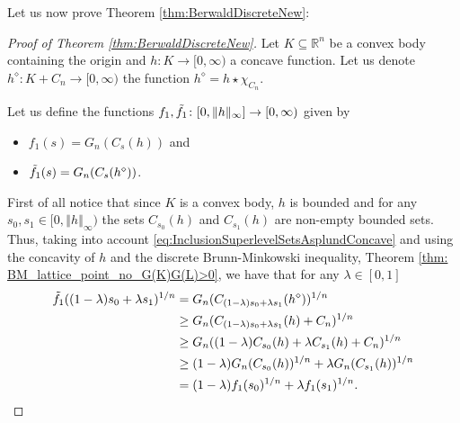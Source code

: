 \documentclass{amsart}
\newcommand{\R}{\mathbb R}
\newcommand{\norma}[1]{\left\Vert#1\right\Vert}
\theoremstyle{remark}
\theoremstyle{definition}
\numberwithin{equation}{section}
\begin{document}
Let us now prove Theorem \ref{thm:BerwaldDiscreteNew}:

\begin{proof}[Proof of Theorem \ref{thm:BerwaldDiscreteNew}]

Let $K\subseteq\R^n$ be a convex body containing the origin and $h:K\to[0,\infty)$ a concave function. Let us denote $h^\diamond: K+C_n\to[0,\infty)$ the function $h^\diamond=h\star\chi_{C_n}$.

Let us define the functions $f_1, \Tilde{f_1} \colon [0, \Vert h\Vert_\infty] \to [0, \infty)$ given by
\begin{itemize}
\item$f_1(s)=G_n(C_s(h))$ and
\item $\Tilde{f_1}(s)=G_n(C_s(h^\diamond))$.
\end{itemize}

First of all notice that since $K$ is a convex body, $h$ is bounded and for any $s_0, s_1 \in [0, \norma{h}_{\infty})$ the sets $C_{s_0}(h)$ and $C_{s_1}(h)$ are non-empty bounded sets. Thus, taking into account \eqref{eq:InclusionSuperlevelSetsAsplundConcave} and using the  concavity of $h$ and the discrete Brunn-Minkowski inequality, Theorem \ref{thm: BM_lattice_point_no_G(K)G(L)>0}, we have that for any $\lambda \in [0,1]$
\begin{align*}
\Tilde{f_1}((1-\lambda)s_0 + \lambda s_1)^{1/n} &= G_n(C_{(1-\lambda)s_0 + \lambda s_1}(h^\diamond))^{1/n} \\
&\geq G_n(C_{(1-\lambda)s_0 + \lambda s_1}(h) + C_n)^{1/n} \\
& \geq G_n((1-\lambda) C_{s_0}(h) + \lambda C_{s_1}(h) + C_n )^{1/n} \\
& \geq (1-\lambda) G_n(C_{s_0}(h))^{1/n} + \lambda G_n(C_{s_1}(h))^{1/n} \\
&=(1-\lambda)f_1(s_0)^{1/n} + \lambda f_1(s_1)^{1/n}.
\end{align*}



\end{proof}
\end{document}
